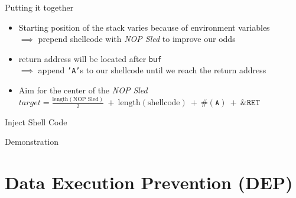 \documentclass[beamer]{uibk}
\begin{document}
\begin{frame}[fragile]{Putting it together}
    \begin{itemize}
        \item Starting position of the stack varies because of environment
            variables\\
            \medskip
            $\implies$ prepend shellcode with \textit{NOP Sled} to improve our
            odds
        \bigskip
        \item return address will be located after \texttt{buf}\\
            \medskip
            $\implies$ append \texttt{'A'}s to our shellcode until we reach the
            return address
        \bigskip
        \item Aim for the center of the \textit{NOP Sled}\\
            \medskip
            $\mathit{target} = \frac{\mathrm{length}(\text{NOP Sled})}{2}\ +\ \mathrm{length}(\text{shellcode})\ +\ \#(\texttt{A})\ +\ \texttt{\&RET}$
   \end{itemize}
   \begin{center}
       
   \end{center}
\end{frame}

\begin{frame}{Inject Shell Code}
    \begin{center}
        \huge Demonstration
    \end{center}
\end{frame}

\section{Data Execution Prevention (DEP)}
\end{document}
